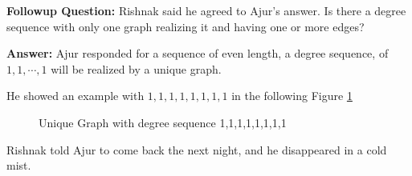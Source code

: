 \textbf {Followup Question:} Rishnak said he agreed to Ajur's answer. Is there a degree sequence with only one graph realizing it and having one or more edges?

\textbf{Answer:} Ajur responded for a sequence of even length, a degree sequence, of $1,1,\cdots, 1$ will be realized by a unique graph.

He showed an example with $1,1,1,1,1,1,1,1$ in the following Figure \ref{daya1}

\begin{figure}
\begin{center}
\caption{ Unique Graph with degree sequence 1,1,1,1,1,1,1,1 }\label{daya1}
\end{center}
\end{figure}

Rishnak told Ajur to come back the next night, and he disappeared in a cold mist.